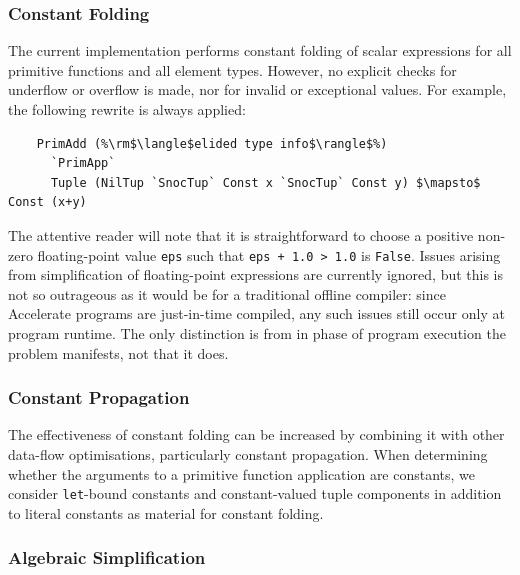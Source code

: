 \subsubsection{Constant Folding}

The current implementation performs constant folding of scalar expressions for
all primitive functions and all element types. However, no explicit checks for
underflow or overflow is made, nor for invalid or exceptional values. For
example, the following rewrite is always applied:
%
%
\begin{lstlisting}[style=Haskell,numbers=none,mathescape]
%\bf$\langle$ constant folding $\rangle$%
    PrimAdd (%\rm$\langle$elided type info$\rangle$%)
      `PrimApp`
      Tuple (NilTup `SnocTup` Const x `SnocTup` Const y) $\mapsto$ Const (x+y)
\end{lstlisting}
%
The attentive reader will note that it is straightforward to choose a positive
non-zero floating-point value \texttt{eps} such that \lstinline{eps + 1.0 > 1.0}
is \texttt{False}. Issues arising from simplification of floating-point
expressions are currently ignored, but this is not so outrageous as it would be
for a traditional offline compiler: since Accelerate programs are just-in-time
compiled, any such issues still occur only at program runtime. The only
distinction is from in phase of program execution the problem manifests, not
that it does.



\subsubsection{Constant Propagation}

The effectiveness of constant folding can be increased by combining it with
other data-flow optimisations, particularly constant propagation. When
determining whether the arguments to a primitive function application are
constants, we consider \texttt{let}-bound constants and constant-valued tuple
components in addition to literal constants as material for constant folding.


\subsubsection{Algebraic Simplification}


